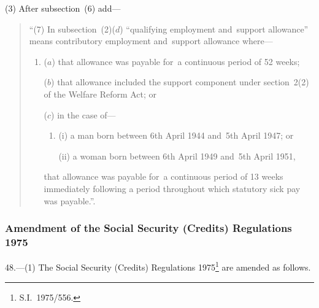 \documentclass[12pt,a4paper]{article}
\begin{document}
(3) After subsection~(6) add—
\begin{quotation}
“(7) In subsection~(2)($d$)  “qualifying employment and~support allowance” means contributory employment and~support allowance where—
\begin{enumerate}\item[]
($a$) that allowance was payable for~a continuous period of 52 weeks;

($b$) that allowance included the support component under section~2(2) of the Welfare Reform Act; or

($c$) in the case of—
\begin{enumerate}\item[]
(i) a man born between 6th April 1944 and~5th April 1947; or

(ii) a woman born between 6th April 1949 and~5th April 1951,
\end{enumerate}
that allowance was payable for~a continuous period of 13 weeks immediately following a period throughout which statutory sick pay was payable.”.
\end{enumerate}
\end{quotation}

\subsubsection[48. Amendment of the Social Security (Credits) Regulations 1975]{Amendment of the Social Security (Credits) Regulations 1975}

48.---(1)  The Social Security (Credits) Regulations 1975\footnote{S.I.~1975/556.} are amended as follows.
\end{document}
